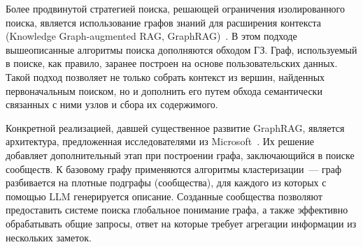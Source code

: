 Более продвинутой стратегией поиска,
решающей ограничения изолированного поиска,
является использование графов знаний для расширения контекста
(Knowledge Graph-augmented RAG, GraphRAG)~\cite{Pan_2024}.
В этом подходе вышеописанные алгоритмы поиска дополняются обходом ГЗ.
Граф, используемый в поиске, как правило,
заранее построен на основе пользовательских данных.
Такой подход позволяет не только собрать контекст из вершин,
найденных первоначальным поиском, но и дополнить его
путем обхода семантически связанных с ними узлов
и сбора их содержимого.

Конкретной реализацией, давшей существенное развитие GraphRAG,
является архитектура, предложенная исследователями из Microsoft~\cite{Edge_2024}.
Их решение добавляет дополнительный этап при построении графа,
заключающийся в поиске сообществ.
К базовому графу применяются
алгоритмы кластеризации~---
граф разбивается на плотные подграфы (сообщества),
для каждого из которых с помощью LLM генерируется
описание.
Созданные сообщества позволяют
предоставить системе поиска глобальное понимание графа,
а также
эффективно обрабатывать общие запросы,
ответ на которые требует агрегации информации
из нескольких заметок.

